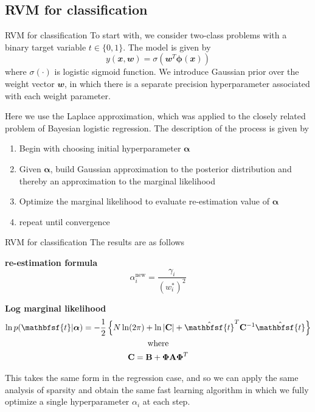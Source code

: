 \documentclass{bredelebeamer}
\begin{document}
\subsection{RVM for classification}
\begin{frame}{RVM for classification}
  To start with, we consider two-class problems with a binary target variable
  $t \in \{0, 1\}$. The model is given by
  \begin{equation}
    y(\mathbfit{x}, \mathbfit{w}) = \sigma( \mathbfit{w}^T \boldsymbol{\phi}(\mathbfit{x}))
  \end{equation}
  where $\sigma(\cdot)$ is logistic sigmoid function. We introduce Gaussian prior
  over the weight vector $\mathbfit{w}$, in which there is a separate precision hyperparameter
  associated with each weight parameter.

  Here we use the Laplace approximation, which was applied to the closely related
  problem of Bayesian logistic regression. The description of the process is given by
  \begin{enumerate}
    \item Begin with choosing initial hyperparameter $\boldsymbol{\alpha}$
    \item Given $\boldsymbol{\alpha}$, build Gaussian approximation to the
    posterior distribution and thereby an approximation to the marginal likelihood
    \item Optimize the marginal likelihood to evaluate re-estimation value of $\boldsymbol{\alpha}$
    \item repeat until convergence
  \end{enumerate}
\end{frame}
\begin{frame}{RVM for classification}
  The results are as follows
  \vspace{1.0\baselineskip}

  \textbf{re-estimation formula}
  \begin{equation}
    \alpha_i^{\textrm{new}} = \frac{\gamma_i}{{(w_i^*)}^2}
  \end{equation}
  \vspace{1.0\baselineskip}

  \textbf{Log marginal likelihood}
  \begin{equation}
    \begin{gathered}
      \ln p(\mathbfsf{t}|\boldsymbol{\alpha})
      = - \frac{1}{2}
      \left\{
      N \ln (2\pi) +
      \ln |\mathbf{C}| +
      \hat{\mathbfsf{t}}^T \mathbf{C}^{-1} \hat{\mathbfsf{t}}
      \right\} \\
      \textrm{where} \\
      \mathbf{C} = \mathbf{B} + \boldsymbol{\Phi} \mathbf{A} \boldsymbol{\Phi}^T
    \end{gathered}
  \end{equation}

  This takes the same form in the regression case, and so we can apply the same
  analysis of sparsity and obtain the same fast learning algorithm in which we
  fully optimize a single hyperparameter $\alpha_i$ at each step.
\end{frame}
\end{document}
